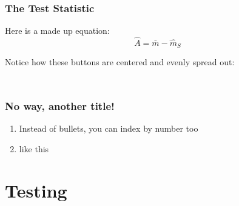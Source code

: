 \documentclass[
    11pt, %
    aspectratio=169, %
]{beamer}
\begin{document}
\begin{frame}
\label{Test Stat}
	\frametitle{The Test Statistic}

        Here is a made up equation:
        $$ \hat{A} = \bar{m}-\hat{m}_S$$ \newline

        Notice how these buttons are centered and evenly spread out:\newline

        \begin{columns}[t] %
		\begin{column}{0.25\textwidth} %
                \hyperlink{Terms}{}
		\end{column}
  		\begin{column}{0.25\textwidth} %
                \hyperlink{Definitions}{}
		\end{column}
            \begin{column}{0.25\textwidth} %
                \hyperlink{Theorems}{}
		\end{column}
	\end{columns}

\end{frame}

\begin{frame}
	\frametitle{No way, another title!}
            \begin{enumerate}
                \item Instead of bullets, you can index by number too\newline
                \item like this
            \end{enumerate}
\end{frame}

\section{Testing}
\end{document}
